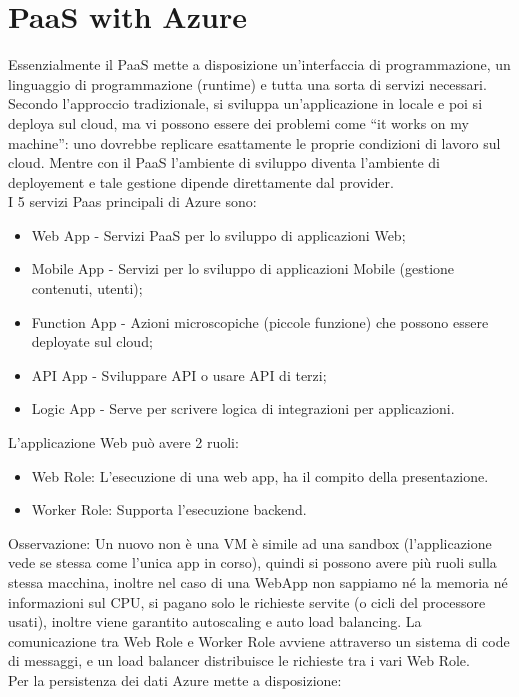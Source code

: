\documentclass[11pt, twocolumn]{article}
\newenvironment{myitemize}
{ \begin{itemize}[topsep=0ex]
		\setlength{\itemsep}{0pt}
		\setlength{\parskip}{0pt}
		\setlength{\parsep}{0pt}     }
	{ \end{itemize}                  }
\begin{document}
\section{PaaS with Azure}
Essenzialmente il PaaS mette a disposizione un'interfaccia di programmazione, un linguaggio di programmazione (runtime) e tutta una sorta di servizi necessari. 
Secondo l'approccio tradizionale, si sviluppa un'applicazione in locale e poi si deploya sul cloud, ma vi possono essere dei problemi come ``it works on my machine'': uno dovrebbe replicare esattamente le proprie condizioni di lavoro sul cloud.
Mentre con il PaaS l'ambiente di sviluppo diventa l'ambiente di deployement e tale gestione dipende direttamente dal provider.\\
I 5 servizi Paas principali di Azure sono:
\begin{myitemize}
	\item Web App - Servizi PaaS per lo sviluppo di applicazioni Web;
	\item Mobile App - Servizi per lo sviluppo di applicazioni Mobile (gestione contenuti, utenti);
	\item Function App - Azioni microscopiche (piccole funzione) che possono essere deployate sul cloud;
	\item API App - Sviluppare API o usare API di terzi;
	\item Logic App - Serve per scrivere logica di integrazioni per applicazioni.
\end{myitemize}
L'applicazione Web può avere 2 ruoli:
\begin{myitemize}
	\item Web Role: L'esecuzione di una web app, ha il compito della presentazione.
	\item Worker Role: Supporta l'esecuzione backend.
\end{myitemize}
Osservazione: Un nuovo non è una VM è simile ad una sandbox (l'applicazione vede se stessa come l'unica app in corso), quindi si possono avere più ruoli sulla stessa macchina, inoltre nel caso di una WebApp non sappiamo né la memoria né informazioni sul CPU, si pagano solo le richieste servite (o cicli del processore usati), inoltre viene garantito autoscaling e auto load balancing.
La comunicazione tra Web Role e Worker Role avviene attraverso un sistema di code di messaggi, e un load balancer distribuisce le richieste tra i vari Web Role.\\
Per la persistenza dei dati Azure mette a disposizione:
\end{document}

